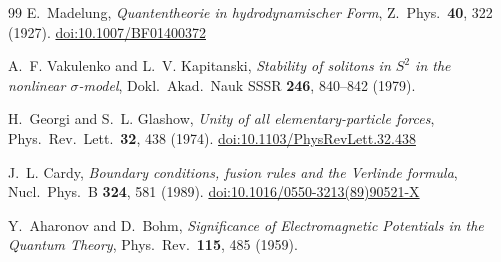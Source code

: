 \documentclass[11pt,a4paper]{article}
\theoremstyle{definition}
\theoremstyle{remark}
\begin{document}
\begin{thebibliography}{99}
E.~Madelung,
\textit{Quantentheorie in hydrodynamischer Form},
Z.\ Phys.\ \textbf{40}, 322 (1927).
\href{https://doi.org/10.1007/BF01400372}{doi:10.1007/BF01400372}

A.~F. Vakulenko and L.~V. Kapitanski,
\textit{Stability of solitons in $S^2$ in the nonlinear $\sigma$-model},
Dokl.\ Akad.\ Nauk SSSR \textbf{246}, 840--842 (1979).

H.~Georgi and S.~L. Glashow,
\textit{Unity of all elementary-particle forces},
Phys.\ Rev.\ Lett.\ \textbf{32}, 438 (1974).
\href{https://doi.org/10.1103/PhysRevLett.32.438}{doi:10.1103/PhysRevLett.32.438}

J.~L. Cardy,
\textit{Boundary conditions, fusion rules and the Verlinde formula},
Nucl.\ Phys.\ B \textbf{324}, 581 (1989).
\href{https://doi.org/10.1016/0550-3213(89)90521-X}{doi:10.1016/0550-3213(89)90521-X}

Y.~Aharonov and D.~Bohm,
\textit{Significance of Electromagnetic Potentials in the Quantum Theory},
Phys.\ Rev.\ \textbf{115}, 485 (1959).

\end{thebibliography}
\end{document}
